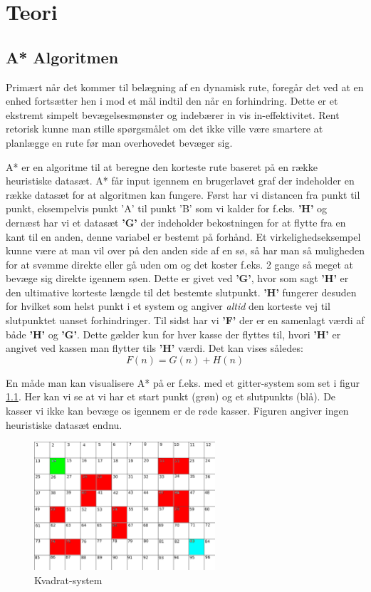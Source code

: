\chapter{Teori}

\section{A* Algoritmen}
Primært når det kommer til belægning af en dynamisk rute, foregår det ved at en enhed fortsætter hen i mod et mål indtil den når en forhindring. Dette er et ekstremt simpelt bevægelsesmønster og indebærer in vis in-effektivitet. Rent retorisk kunne man stille spørgsmålet om det ikke ville være smartere at planlægge en rute før man overhovedet bevæger sig.

A* er en algoritme til at beregne den korteste rute baseret på en række heuristiske datasæt. A* får input igennem en brugerlavet graf der indeholder en række datasæt for at algoritmen kan fungere.  Først har vi distancen fra punkt til punkt, eksempelvis punkt 'A' til punkt 'B' som vi kalder for f.eks. \textbf{'H'} og dernæst har vi et datasæt \textbf{'G'} der indeholder bekostningen for at flytte fra en kant til en anden, denne variabel er bestemt på forhånd. Et virkelighedseksempel kunne være at man vil over på den anden side af en sø, så har man så muligheden for at svømme direkte eller gå uden om og det koster f.eks. 2 gange så meget at bevæge sig direkte igennem søen. Dette er givet ved \textbf{'G'}, hvor som sagt \textbf{'H'} er den ultimative korteste længde til det bestemte slutpunkt. \textbf{'H'} fungerer desuden for hvilket som helst punkt i et system og angiver \textit{altid} den korteste vej til slutpunktet uanset forhindringer. Til sidst har vi \textbf{'F'} der er en samenlagt værdi af både \textbf{'H'} og \textbf{'G'}. Dette gælder kun for hver kasse der flyttes til, hvori \textbf{'H'} er angivet ved kassen man flytter tils \textbf{'H'} værdi. Det kan vises således:
\begin{equation}
F(n) = G(n) + H(n)
\end{equation}

En måde man kan visualisere A* på er f.eks. med et gitter-system som set i figur \ref{A*Kvadrat-1}. Her kan vi se at vi har et start punkt (grøn) og et slutpunkts (blå). De kasser vi ikke kan bevæge os igennem er de røde kasser. Figuren angiver ingen heuristiske datasæt endnu.

\begin{figure}
    \centering
    \includegraphics[width=0.60\textwidth]{Pictures/Teoriafsnit/Figurfiler/Grid2.png}
    \caption{Kvadrat-system}
    \label{A*Kvadrat-1}
\end{figure}

